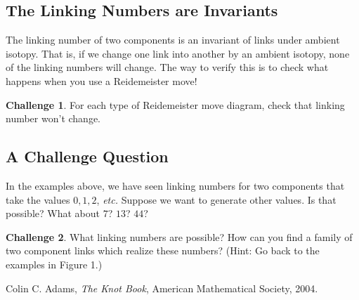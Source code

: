 \documentclass[12pt,letterpaper]{article}
\theoremstyle{definition}
\newtheorem*{challenge}{Challenge}
\begin{document}
\clearpage

\subsection*{The Linking Numbers are Invariants}

The linking number of two components is an invariant of links under ambient isotopy.
That is, if we change one link into another by an ambient isotopy, none of the linking numbers will change.
The way to verify this is to check what happens when you use a Reidemeister move!

\begin{challenge}
For each type of Reidemeister move diagram, check that linking number won't change.
\end{challenge}

\subsection*{A Challenge Question}

In the examples above, we have seen linking numbers for two components that take the values $0, 1, 2$, \emph{etc.}
Suppose we want to generate other values.
Is that possible?
What about $7$? $13$? $44$?

\begin{challenge}
What linking numbers are possible?
How can you find a family of two component links which realize these numbers?
(Hint: Go back to the examples in Figure 1.)
\end{challenge}


\begin{thebibliography}{9}
	Colin C. Adams,
	\emph{The Knot Book},
	American Mathematical Society, 
	2004.	
\end{thebibliography}
\end{document}
